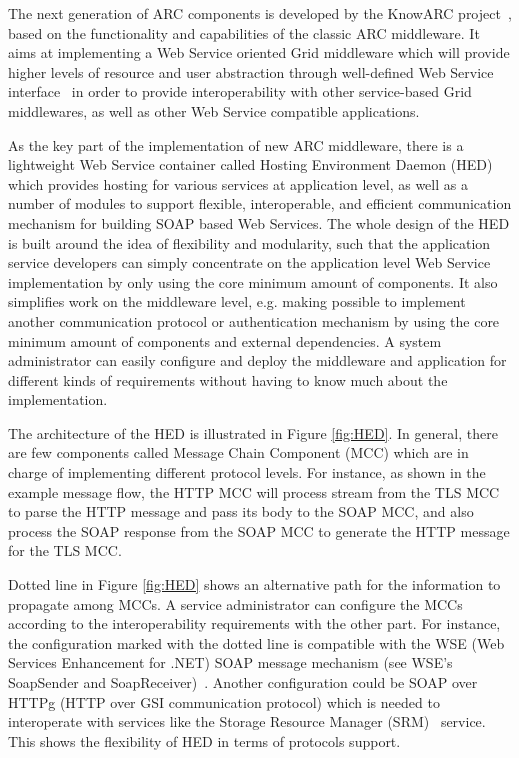 \documentclass[twocolumn]{svjour3}         %
\begin{document}
The next generation of ARC components is developed by the KnowARC project~\cite{KnowARClink}, based on the functionality and capabilities of the classic ARC middleware. It aims at implementing a Web Service oriented Grid middleware which will provide higher levels of resource and user abstraction through well-defined Web Service interface~\cite{KnowARCDesignlink} in order to provide interoperability with other service-based Grid middlewares, as well as other Web Service compatible applications.

As the key part of the implementation of new ARC middleware, there is a lightweight Web Service container called Hosting Environment Daemon (HED) which provides hosting for various services at application level, as well as a number of modules to support flexible, interoperable, and efficient communication mechanism for building SOAP based Web Services. The whole design of the HED is built around the idea of flexibility and modularity, such that the application service developers can simply concentrate on the application level Web Service implementation by only using the core minimum amount of components. It also simplifies work on the middleware level, e.g. making possible to implement another communication protocol or authentication mechanism by using the core minimum amount of components and external dependencies. A system administrator can easily configure and deploy the middleware and application for different kinds of requirements without having to know much about the implementation. 

The architecture of the HED is illustrated in Figure \ref{fig:HED}. In general, there are few components called Message Chain Component (MCC) which are in charge of implementing different protocol levels. For instance, as shown in the example message flow, the HTTP MCC will process stream from the TLS MCC to parse the HTTP message and pass its body to the SOAP MCC, and also process the SOAP response from the SOAP MCC to generate the HTTP message for the TLS MCC.

Dotted line in Figure \ref{fig:HED} shows an alternative path for the information to propagate among MCCs. A service administrator can configure the MCCs according to the interoperability requirements with the other part. For instance, the configuration marked with the dotted line is compatible with the WSE (Web Services Enhancement for .NET) SOAP message mechanism (see WSE’s SoapSender and SoapReceiver)~\cite{WSElink}. Another configuration could be SOAP over HTTPg (HTTP over GSI communication protocol) which is needed to interoperate with services like the Storage Resource Manager (SRM)~\cite{AShoshani03} service. This shows the flexibility of HED in terms of protocols support.
\end{document}
